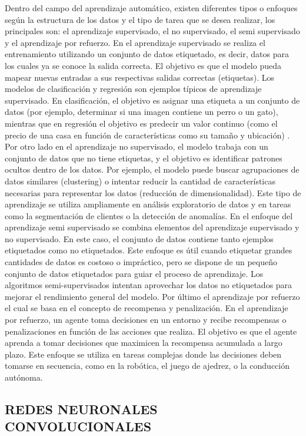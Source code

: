 Dentro del campo del aprendizaje automático, existen diferentes tipos o enfoques según la
estructura de los datos y el tipo de tarea que se desea realizar, los principales son: el
aprendizaje supervisado, el no supervisado, el semi supervisado y el aprendizaje por
refuerzo. En el aprendizaje supervisado se realiza el entrenamiento utilizando un conjunto
de datos etiquetado, es decir, datos para los cuales ya se conoce la salida correcta. El
objetivo es que el modelo pueda mapear nuevas entradas a sus respectivas salidas correctas
(etiquetas). Los modelos de clasificación y regresión son ejemplos típicos de aprendizaje
supervisado. En clasificación, el objetivo es asignar una etiqueta a un conjunto de datos
(por ejemplo, determinar si una imagen contiene un perro o un gato), mientras que en
regresión el objetivo es predecir un valor continuo (como el precio de una casa en función
de características como su tamaño y ubicación) . Por otro
lado en el aprendizaje no supervisado, el modelo trabaja con un conjunto de datos que no
tiene etiquetas, y el objetivo es identificar patrones ocultos dentro de los datos. Por
ejemplo, el modelo puede buscar agrupaciones de datos similares (clustering) o intentar
reducir la cantidad de características necesarias para representar los datos (reducción de
dimensionalidad). Este tipo de aprendizaje se utiliza ampliamente en análisis exploratorio
de datos y en tareas como la segmentación de clientes o la detección de anomalías. En el
enfoque del aprendizaje semi supervisado se combina elementos del aprendizaje supervisado
y no supervisado. En este caso, el conjunto de datos contiene tanto ejemplos etiquetados
como no etiquetados. Este enfoque es útil cuando etiquetar grandes cantidades de datos es
costoso o impráctico, pero se dispone de un pequeño conjunto de datos etiquetados para
guiar el proceso de aprendizaje. Los algoritmos semi-supervisados intentan aprovechar los
datos no etiquetados para mejorar el rendimiento general del modelo. Por último el
aprendizaje por refuerzo el cual se basa en el concepto de recompensa y penalización. En
el aprendizaje por refuerzo, un agente toma decisiones en un entorno y recibe recompensas
o penalizaciones en función de las acciones que realiza. El objetivo es que el agente
aprenda a tomar decisiones que maximicen la recompensa acumulada a largo plazo. Este
enfoque se utiliza en tareas complejas donde las decisiones deben tomarse en secuencia,
como en la robótica, el juego de ajedrez, o la conducción autónoma.

\subsection{REDES NEURONALES CONVOLUCIONALES}

